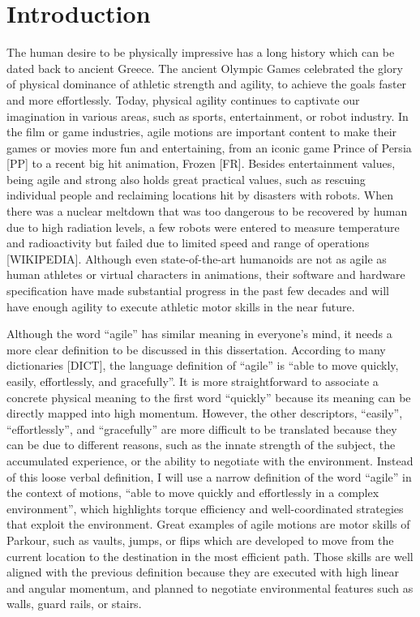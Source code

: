 \chapter{Introduction}

The human desire to be physically impressive has a long history which can be
dated back to ancient Greece.
The ancient Olympic Games celebrated the glory of physical dominance of
athletic strength and agility, to achieve the goals faster and more
effortlessly. 
Today, physical agility continues to captivate our imagination in
various areas, such as sports, entertainment, or robot industry.
In the film or game industries, agile motions are important content to make
their games or movies more fun and entertaining, from an iconic game
Prince of Persia [PP] to a recent big hit animation, Frozen [FR].
Besides entertainment values, being agile and strong also holds great practical
values, such as rescuing individual people and reclaiming locations hit by
disasters with robots.
When there was a nuclear meltdown that was too dangerous to be recovered
by human due to high radiation levels, a few robots were entered to measure
temperature and radioactivity but failed due to limited speed and range of
operations [WIKIPEDIA].
Although even state-of-the-art humanoids are not as agile as human athletes
or virtual characters in animations, their software and hardware specification
have made substantial progress in the past few decades and will have enough 
agility to execute athletic motor skills in the near future.

Although the word ``agile'' has similar meaning in everyone's mind,
it needs a more clear definition to be discussed in this dissertation.
According to many dictionaries [DICT], the language definition of ``agile''
is ``able to move quickly, easily, effortlessly, and gracefully''.
It is more straightforward to associate a concrete physical meaning to the
first word ``quickly'' because its meaning can be directly mapped into
high momentum.
However, the other descriptors, ``easily'', ``effortlessly'', and
``gracefully'' are more difficult to be translated because they can be due to
different reasons, such as the innate strength of the subject, the accumulated
experience, or the ability to negotiate with the environment.
Instead of this loose verbal definition, I will use a narrow definition of the
word ``agile'' in the context of motions, ``able to move quickly and
effortlessly in a complex environment'', which highlights torque efficiency
and well-coordinated strategies that exploit the environment.
Great examples of agile motions are motor skills of Parkour, such as
vaults, jumps, or flips which are developed to move from the current location
to the destination in the most efficient path.
Those skills are well aligned with the previous definition because they are
executed with high linear and angular momentum, and planned to negotiate
environmental features such as walls, guard rails, or stairs. 

